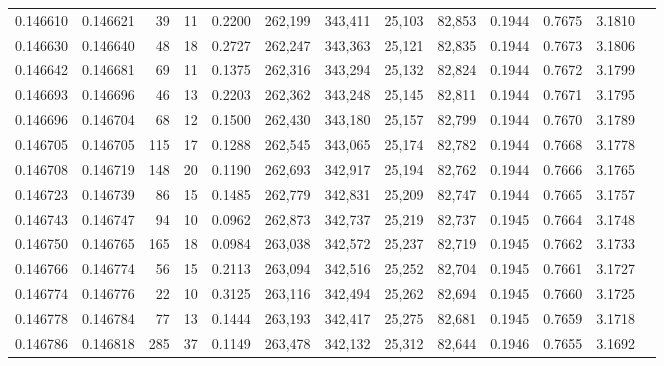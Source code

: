 \begin{tabular}{rrrrrrrrrrrrr}
0.146610 & 0.146621 &    39 &  11 &                                     0.2200 & 262,199 & 343,411 &  25,103 &  82,853 & 0.1944 & 0.7675 & 3.1810 \\
0.146630 & 0.146640 &    48 &  18 &                                     0.2727 & 262,247 & 343,363 &  25,121 &  82,835 & 0.1944 & 0.7673 & 3.1806 \\
0.146642 & 0.146681 &    69 &  11 &                                     0.1375 & 262,316 & 343,294 &  25,132 &  82,824 & 0.1944 & 0.7672 & 3.1799 \\
0.146693 & 0.146696 &    46 &  13 &                                     0.2203 & 262,362 & 343,248 &  25,145 &  82,811 & 0.1944 & 0.7671 & 3.1795 \\
0.146696 & 0.146704 &    68 &  12 &                                     0.1500 & 262,430 & 343,180 &  25,157 &  82,799 & 0.1944 & 0.7670 & 3.1789 \\
0.146705 & 0.146705 &   115 &  17 &                                     0.1288 & 262,545 & 343,065 &  25,174 &  82,782 & 0.1944 & 0.7668 & 3.1778 \\
0.146708 & 0.146719 &   148 &  20 &                                     0.1190 & 262,693 & 342,917 &  25,194 &  82,762 & 0.1944 & 0.7666 & 3.1765 \\
0.146723 & 0.146739 &    86 &  15 &                                     0.1485 & 262,779 & 342,831 &  25,209 &  82,747 & 0.1944 & 0.7665 & 3.1757 \\
0.146743 & 0.146747 &    94 &  10 &                                     0.0962 & 262,873 & 342,737 &  25,219 &  82,737 & 0.1945 & 0.7664 & 3.1748 \\
0.146750 & 0.146765 &   165 &  18 &                                     0.0984 & 263,038 & 342,572 &  25,237 &  82,719 & 0.1945 & 0.7662 & 3.1733 \\
0.146766 & 0.146774 &    56 &  15 &                                     0.2113 & 263,094 & 342,516 &  25,252 &  82,704 & 0.1945 & 0.7661 & 3.1727 \\
0.146774 & 0.146776 &    22 &  10 &                                     0.3125 & 263,116 & 342,494 &  25,262 &  82,694 & 0.1945 & 0.7660 & 3.1725 \\
0.146778 & 0.146784 &    77 &  13 &                                     0.1444 & 263,193 & 342,417 &  25,275 &  82,681 & 0.1945 & 0.7659 & 3.1718 \\
0.146786 & 0.146818 &   285 &  37 &                                     0.1149 & 263,478 & 342,132 &  25,312 &  82,644 & 0.1946 & 0.7655 & 3.1692 \\

\end{tabular}
